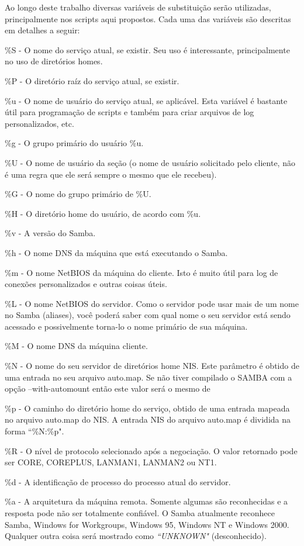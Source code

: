 Ao longo deste trabalho diversas variáveis de substituição serão utilizadas, principalmente nos scripts aqui propostos. Cada uma das variáveis são descritas em detalhes a seguir:

\%S - O nome do serviço atual, se existir. Seu uso é interessante, principalmente no uso de diretórios homes.

\%P - O diretório raíz do serviço atual, se existir.

\%u - O nome de usuário do serviço atual, se aplicável. Esta variável é bastante útil para programação de scripts e também para criar arquivos de log personalizados, etc.

\%g - O grupo primário do usuário \%u.

\%U - O nome de usuário da seção (o nome de usuário solicitado pelo cliente, não é uma regra que ele será sempre o mesmo que ele recebeu).

\%G - O nome do grupo primário de \%U.

\%H - O diretório home do usuário, de acordo com \%u.

\%v - A versão do Samba.

\%h - O nome DNS da máquina que está executando o Samba.

\%m - O nome NetBIOS da máquina do cliente. Isto é muito útil para log de conexões personalizados e outras coisas úteis.

\%L - O nome NetBIOS do servidor. Como o servidor pode usar mais de um nome no Samba (aliases), você poderá saber com qual nome o seu servidor está sendo acessado e possivelmente torna-lo o nome primário de sua máquina.

\%M - O nome DNS da máquina cliente.

\%N - O nome do seu servidor de diretórios home NIS. Este parâmetro é obtido de uma entrada no seu arquivo auto.map. Se não tiver compilado o SAMBA com a opção --with-automount então este valor será o mesmo de %

\%p - O caminho do diretório home do serviço, obtido de uma entrada mapeada no arquivo auto.map do NIS. A entrada NIS do arquivo auto.map é dividida na forma ``\%N:\%p".

\%R - O nível de protocolo selecionado após a negociação. O valor retornado pode ser CORE, COREPLUS, LANMAN1, LANMAN2 ou NT1.

\%d - A identificação de processo do processo atual do servidor.

\%a - A arquitetura da máquina remota. Somente algumas são reconhecidas e a resposta pode não ser totalmente confiável. O Samba atualmente reconhece Samba, Windows for Workgroups, Windows 95, Windows NT e Windows 2000. Qualquer outra coisa será mostrado como \textit{``UNKNOWN"} (desconhecido).

